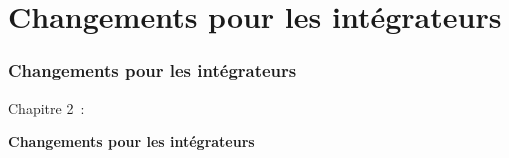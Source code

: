 %

\section{Changements pour les intégrateurs}
\begin{frame}[fragile]
	\frametitle{Changements pour les intégrateurs}

	\begin{center}\huge{Chapitre 2~:}\end{center}
	\begin{center}\huge{\color{typo3darkgrey}\textbf{Changements pour les intégrateurs}}\end{center}

\end{frame}

